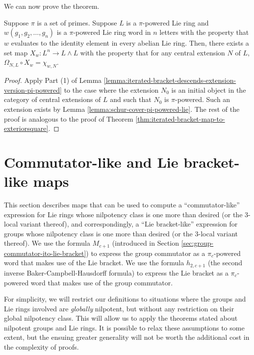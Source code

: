 We can now prove the theorem.

\begin{theorem}\label{thm:iterated-bracket-map-to-exteriorsquare-pi-powered}
  Suppose $\pi$ is a set of primes. Suppose $L$ is a $\pi$-powered Lie
  ring and $w(g_1,g_2,\dots,g_n)$ is a $\pi$-powered Lie ring word in
  $n$ letters with the property that $w$ evaluates to the identity
  element in every abelian Lie ring. Then, there exists a set map
  $X_w:L^n \to L \wedge L$ with the property that for any central
  extension $N$ of $L$, $\Omega_{N,L} \circ X_w = \chi_{w,N}$.
\end{theorem}

\begin{proof}
  Apply Part (1) of Lemma
  \ref{lemma:iterated-bracket-descends-extension-version-pi-powered} to
  the case where the extension $N_0$ is an initial object in the
  category of central extensions of $L$ and such that $N_0$ is
  $\pi$-powered. Such an extension exists by Lemma
  \ref{lemma:schur-cover-pi-powered-lie}. The rest of the proof is
  analogous to the proof of Theorem \ref{thm:iterated-bracket-map-to-exteriorsquare}.
\end{proof}



\section{Commutator-like and Lie bracket-like maps}\label{sec:commutator-and-lie-bracket-like-maps}

This section describes maps that can be used to compute a
``commutator-like'' expression for Lie rings whose nilpotency class is
one more than desired (or the $3$-local variant thereof), and
correspondingly, a ``Lie bracket-like'' expression for groups whose
nilpotency class is one more than desired (or the $3$-local variant
thereof). We use the formula $M_{c+1}$ (introduced in Section
\ref{sec:group-commutator-ito-lie-bracket}) to express the group
commutator as a $\pi_c$-powered word that makes use of the Lie
bracket. We use the formula $h_{2,c+1}$ (the second inverse
Baker-Campbell-Hausdorff formula) to express the Lie bracket as a
$\pi_c$-powered word that makes use of the group commutator.

For simplicity, we will restrict our definitions to situations where
the groups and Lie rings involved are {\em globally} nilpotent, but
without any restriction on their global nilpotency class. This will
allow us to apply the theorems stated about nilpotent groups and Lie
rings. It is possible to relax these assumptions to some extent, but
the ensuing greater generality will not be worth the additional cost
in the complexity of proofs.

